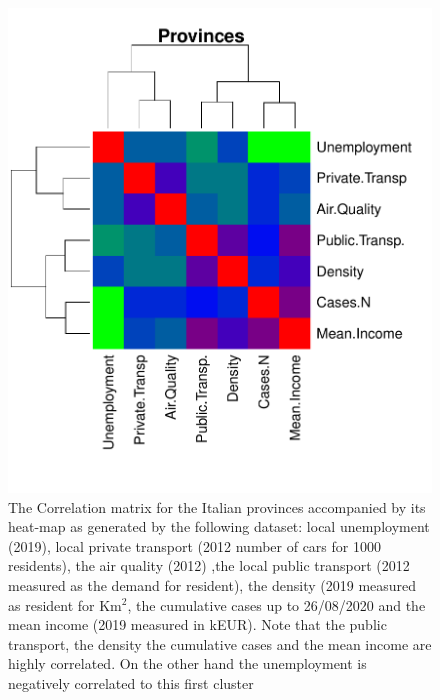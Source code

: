 \documentclass[
12pt, %
a4paper, %
oneside, %
headinclude,footinclude, %
BCOR5mm, %
]{scrartcl}
\begin{document}
\begin{figure}[h]
\begin{center}
\includegraphics[scale=1]{Pic/Province_FULL_CorrMatrix.pdf}
\caption{The Correlation matrix for the Italian provinces accompanied by its heat-map as generated by the following dataset: local unemployment (2019), local private transport (2012 number of cars for 1000 residents), the air quality (2012) ,the local public transport (2012 measured as the demand for resident), the density  (2019 measured as resident for Km$^{2}$, the cumulative cases up to 26/08/2020 and the mean income (2019 measured in kEUR). Note that the public transport, the density the cumulative cases and the mean income are highly correlated. On the other hand the unemployment is negatively correlated to this first cluster}
\label{Province_corr_matrix}
\end{center}
\end{figure}
\end{document}
